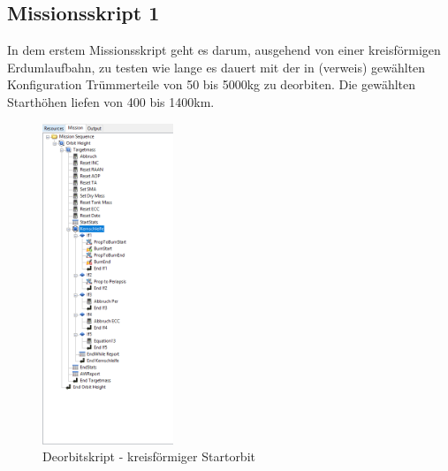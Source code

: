 
\subsection{Missionsskript 1}

In dem erstem Missionsskript geht es darum, ausgehend von einer kreisförmigen Erdumlaufbahn, zu testen wie lange es dauert mit der in (verweis) gewählten Konfiguration Trümmerteile von 50 bis 5000kg zu deorbiten. Die gewählten Starthöhen liefen von 400 bis 1400km.\\

\begin{figure}[!h]
	\centering
		\includegraphics[width=0.35\textwidth]{graphics/GMAT/GMAT_Skript_Kreis.PNG}
		\caption{Deorbitskript - kreisförmiger Startorbit}
			\label{fig:GMAT_Skript_Kreis}
\end{figure}



